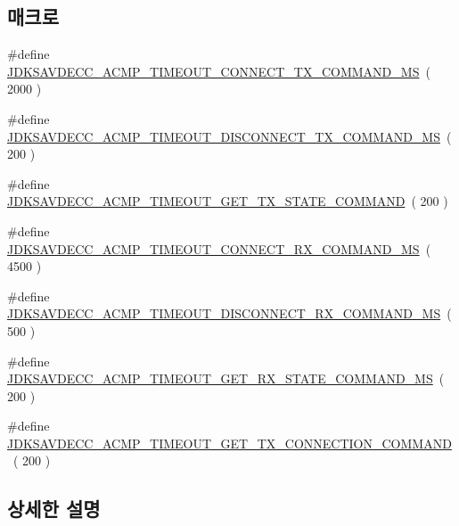 \subsection*{매크로}
\begin{DoxyCompactItemize}
\item 
\#define \hyperlink{group__acmp__timeouts_ga9ec5b6cae8832db02755f912e7f4f564}{J\+D\+K\+S\+A\+V\+D\+E\+C\+C\+\_\+\+A\+C\+M\+P\+\_\+\+T\+I\+M\+E\+O\+U\+T\+\_\+\+C\+O\+N\+N\+E\+C\+T\+\_\+\+T\+X\+\_\+\+C\+O\+M\+M\+A\+N\+D\+\_\+\+MS}~( 2000 )
\item 
\#define \hyperlink{group__acmp__timeouts_ga4181116616bbf653c045d11e0b027565}{J\+D\+K\+S\+A\+V\+D\+E\+C\+C\+\_\+\+A\+C\+M\+P\+\_\+\+T\+I\+M\+E\+O\+U\+T\+\_\+\+D\+I\+S\+C\+O\+N\+N\+E\+C\+T\+\_\+\+T\+X\+\_\+\+C\+O\+M\+M\+A\+N\+D\+\_\+\+MS}~( 200 )
\item 
\#define \hyperlink{group__acmp__timeouts_ga0475a741d0f627cf0ae1515a7eec50b2}{J\+D\+K\+S\+A\+V\+D\+E\+C\+C\+\_\+\+A\+C\+M\+P\+\_\+\+T\+I\+M\+E\+O\+U\+T\+\_\+\+G\+E\+T\+\_\+\+T\+X\+\_\+\+S\+T\+A\+T\+E\+\_\+\+C\+O\+M\+M\+A\+ND}~( 200 )
\item 
\#define \hyperlink{group__acmp__timeouts_ga5394847da570c19b6a35f004bc85e200}{J\+D\+K\+S\+A\+V\+D\+E\+C\+C\+\_\+\+A\+C\+M\+P\+\_\+\+T\+I\+M\+E\+O\+U\+T\+\_\+\+C\+O\+N\+N\+E\+C\+T\+\_\+\+R\+X\+\_\+\+C\+O\+M\+M\+A\+N\+D\+\_\+\+MS}~( 4500 )
\item 
\#define \hyperlink{group__acmp__timeouts_ga6f8b184d92e47793ca728487cf33eabd}{J\+D\+K\+S\+A\+V\+D\+E\+C\+C\+\_\+\+A\+C\+M\+P\+\_\+\+T\+I\+M\+E\+O\+U\+T\+\_\+\+D\+I\+S\+C\+O\+N\+N\+E\+C\+T\+\_\+\+R\+X\+\_\+\+C\+O\+M\+M\+A\+N\+D\+\_\+\+MS}~( 500 )
\item 
\#define \hyperlink{group__acmp__timeouts_ga5e9524a85129b8c7cda5ccf5093dbca9}{J\+D\+K\+S\+A\+V\+D\+E\+C\+C\+\_\+\+A\+C\+M\+P\+\_\+\+T\+I\+M\+E\+O\+U\+T\+\_\+\+G\+E\+T\+\_\+\+R\+X\+\_\+\+S\+T\+A\+T\+E\+\_\+\+C\+O\+M\+M\+A\+N\+D\+\_\+\+MS}~( 200 )
\item 
\#define \hyperlink{group__acmp__timeouts_gab714aa8836a5ae35c06fe337ddff2e61}{J\+D\+K\+S\+A\+V\+D\+E\+C\+C\+\_\+\+A\+C\+M\+P\+\_\+\+T\+I\+M\+E\+O\+U\+T\+\_\+\+G\+E\+T\+\_\+\+T\+X\+\_\+\+C\+O\+N\+N\+E\+C\+T\+I\+O\+N\+\_\+\+C\+O\+M\+M\+A\+ND}~( 200 )
\end{DoxyCompactItemize}


\subsection{상세한 설명}


